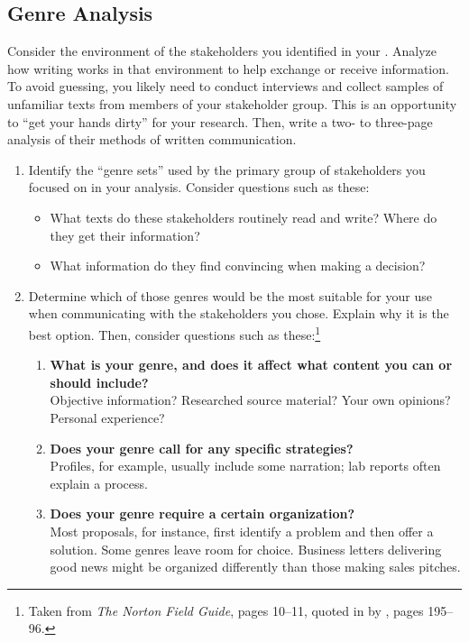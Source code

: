 \documentclass[10pt,oneside]{amsart}	%
\begin{document}
\subsection{Genre Analysis} %
\label{sub:genre_analysis}
Consider the environment of the stakeholders you identified in your . Analyze how writing works in that environment to help exchange or receive information. To avoid guessing, you likely need to conduct interviews %
and collect samples of unfamiliar texts from members of your stakeholder group. This is an opportunity to ``get your hands dirty'' for your research. Then, write a two- to three-page analysis of their methods of written communication.
	\begin{enumerate} %
		\item  Identify the ``genre sets'' used by the primary group of stakeholders you focused on in your analysis. Consider questions such as these:
		\begin{itemize}
			\item What texts do these stakeholders routinely read and write? Where do they get their information? 
			\item  What information do they find convincing when making a decision?
		\end{itemize}
		\item Determine which of those genres would be the most suitable for your use when communicating with the stakeholders you chose. Explain why it is the best option. Then, consider questions such as these:\footnote{Taken from \emph{The Norton Field Guide}, pages 10–11, quoted in  by \citeauthor{bawarshi2010genre}, pages 195–96.}
		\begin{enumerate}
	\item \textbf{What is your genre, and does it affect what content you can or should include?}\\ Objective information? Researched source material? Your own opinions? Personal experience?
\item \textbf{Does your genre call for any specific strategies?}\\ Profiles, for example, usually include some narration; lab reports often explain a process.
\item \textbf{Does your genre require a certain organization?}\\ Most proposals, for instance, first identify a problem and then offer a solution. Some genres leave room for choice. Business letters delivering good news might be organized differently than those making sales pitches.

\end{enumerate}
\end{enumerate}
\end{document}
